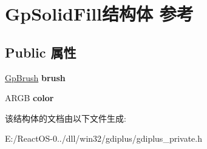 \hypertarget{struct_gp_solid_fill}{}\section{Gp\+Solid\+Fill结构体 参考}
\label{struct_gp_solid_fill}
\subsection*{Public 属性}
\begin{DoxyCompactItemize}
\item 
\mbox{\label{struct_gp_solid_fill_aa99599c92d2a050ab5dd9cc63b8432aa}} 
\hyperlink{struct_gp_brush}{Gp\+Brush} {\bfseries brush}
\item 
\mbox{\label{struct_gp_solid_fill_ac4e993275e4b4307056334397572d485}} 
A\+R\+GB {\bfseries color}
\end{DoxyCompactItemize}


该结构体的文档由以下文件生成\+:\begin{DoxyCompactItemize}
\item 
E\+:/\+React\+O\+S-\/0../dll/win32/gdiplus/gdiplus\+\_\+private.\+h\end{DoxyCompactItemize}
